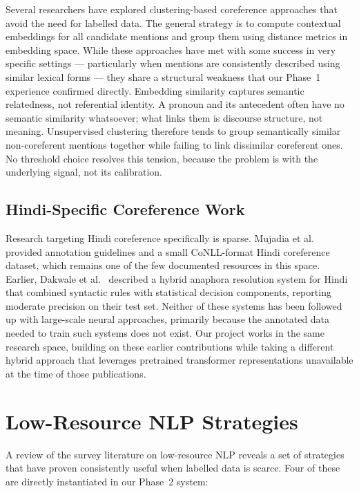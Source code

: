\documentclass[12pt,a4paper]{report}
\begin{document}
Several researchers have explored clustering-based coreference approaches that avoid the need for labelled data. The general strategy is to compute contextual embeddings for all candidate mentions and group them using distance metrics in embedding space. While these approaches have met with some success in very specific settings --- particularly when mentions are consistently described using similar lexical forms --- they share a structural weakness that our Phase~1 experience confirmed directly. Embedding similarity captures semantic relatedness, not referential identity. A pronoun and its antecedent often have no semantic similarity whatsoever; what links them is discourse structure, not meaning. Unsupervised clustering therefore tends to group semantically similar non-coreferent mentions together while failing to link dissimilar coreferent ones. No threshold choice resolves this tension, because the problem is with the underlying signal, not its calibration.

\subsection{Hindi-Specific Coreference Work}

Research targeting Hindi coreference specifically is sparse. Mujadia et al.\ \cite{mujadia2016hindi} provided annotation guidelines and a small CoNLL-format Hindi coreference dataset, which remains one of the few documented resources in this space. Earlier, Dakwale et al.\ \cite{dakwale2013anaphora} described a hybrid anaphora resolution system for Hindi that combined syntactic rules with statistical decision components, reporting moderate precision on their test set. Neither of these systems has been followed up with large-scale neural approaches, primarily because the annotated data needed to train such systems does not exist. Our project works in the same research space, building on these earlier contributions while taking a different hybrid approach that leverages pretrained transformer representations unavailable at the time of those publications.

\section{Low-Resource NLP Strategies}

A review of the survey literature on low-resource NLP \cite{hedderich2021survey} reveals a set of strategies that have proven consistently useful when labelled data is scarce. Four of these are directly instantiated in our Phase~2 system:
\end{document}
